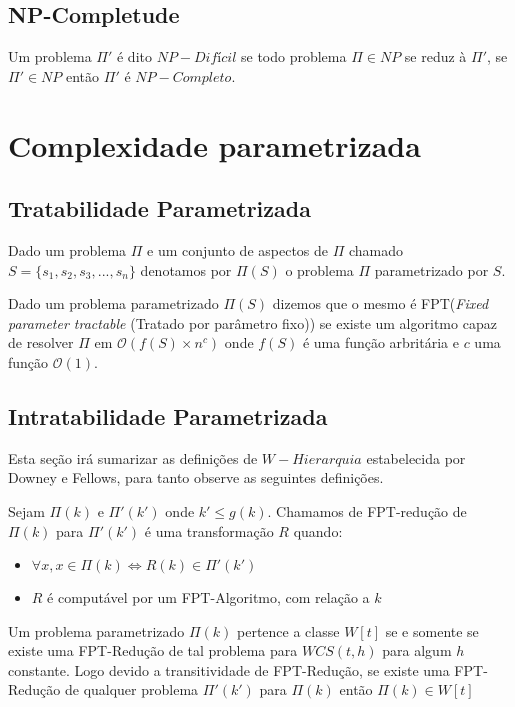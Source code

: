 \subsection{NP-Completude}
Um problema $\Pi'$ é dito $NP-Difícil$ se todo problema $\Pi \in NP$ se reduz à $\Pi'$, se $\Pi' \in NP$ então $\Pi'$ é $NP-Completo$.

\section{Complexidade parametrizada}

\subsection{Tratabilidade Parametrizada}
\begin{definition}
Dado um problema $\Pi$ e um conjunto de aspectos de $\Pi$ chamado $S = \{s_1,s_2,s_3,...,s_n\}$ denotamos por $\Pi(S)$ o problema $\Pi$ parametrizado por $S$.
\end{definition}
\begin{definition}
Dado um problema parametrizado $\Pi(S)$ dizemos que o mesmo é FPT(\emph{Fixed parameter tractable} (Tratado por parâmetro fixo)) se existe um algoritmo capaz de resolver $\Pi$ em $\mathcal{O}(f(S)\times n^c)$ onde $f(S)$ é uma função arbritária e $c$ uma função $\mathcal{O}(1)$.
\end{definition}

\subsection{Intratabilidade Parametrizada}
Esta seção irá sumarizar as definições de $W-Hierarquia$ estabelecida por Downey e Fellows, para tanto observe as seguintes definições.
\begin{definition}
 Sejam $\Pi(k)$ e $\Pi'(k')$ onde $k' \leq g(k)$. Chamamos de FPT-redução de $\Pi(k)$ para $\Pi'(k')$ é uma transformação $R$ quando:
 \begin{itemize}
   \item $\forall x, x \in \Pi(k) \iff R(k) \in \Pi'(k')$
   \item $R$ é computável por um FPT-Algoritmo, com relação a $k$
 \end{itemize}
\end{definition}

\begin{definition}
 Um problema parametrizado $\Pi(k)$ pertence a classe $W[t]$ se e somente se existe uma FPT-Redução de tal problema para $WCS(t,h)$ para algum $h$ constante. Logo devido a transitividade de FPT-Redução, se existe uma FPT-Redução de qualquer problema $\Pi'(k')$ para $\Pi(k)$ então $\Pi(k) \in W[t]$
\end{definition}
